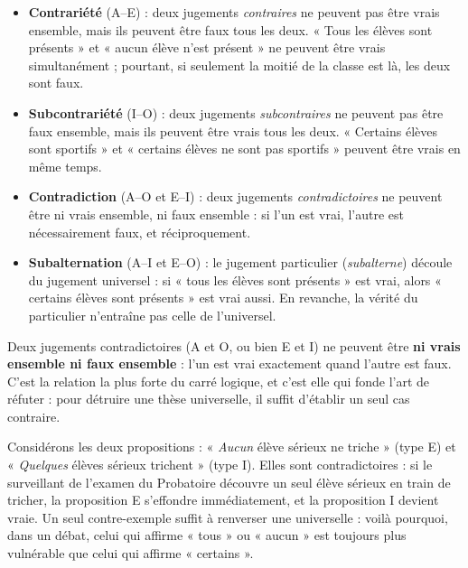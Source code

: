 \documentclass[11pt]{article}
\begin{document}
\begin{definition}
\begin{itemize}
\item \textbf{Contrariété} (A--E) : deux jugements \emph{contraires} ne peuvent pas être vrais ensemble, mais ils peuvent être faux tous les deux. « Tous les élèves sont présents » et « aucun élève n'est présent » ne peuvent être vrais simultanément ; pourtant, si seulement la moitié de la classe est là, les deux sont faux.
\item \textbf{Subcontrariété} (I--O) : deux jugements \emph{subcontraires} ne peuvent pas être faux ensemble, mais ils peuvent être vrais tous les deux. « Certains élèves sont sportifs » et « certains élèves ne sont pas sportifs » peuvent être vrais en même temps.
\item \textbf{Contradiction} (A--O et E--I) : deux jugements \emph{contradictoires} ne peuvent être ni vrais ensemble, ni faux ensemble : si l'un est vrai, l'autre est nécessairement faux, et réciproquement.
\item \textbf{Subalternation} (A--I et E--O) : le jugement particulier (\emph{subalterne}) découle du jugement universel : si « tous les élèves sont présents » est vrai, alors « certains élèves sont présents » est vrai aussi. En revanche, la vérité du particulier n'entraîne pas celle de l'universel.
\end{itemize}
\end{definition}

\begin{propriete}
Deux jugements contradictoires (A et O, ou bien E et I) ne peuvent être \textbf{ni vrais ensemble ni faux ensemble} : l'un est vrai exactement quand l'autre est faux. C'est la relation la plus forte du carré logique, et c'est elle qui fonde l'art de réfuter : pour détruire une thèse universelle, il suffit d'établir un seul cas contraire.
\end{propriete}

\begin{exemplebox}
Considérons les deux propositions : « \emph{Aucun} élève sérieux ne triche » (type E) et « \emph{Quelques} élèves sérieux trichent » (type I). Elles sont contradictoires : si le surveillant de l'examen du Probatoire découvre un seul élève sérieux en train de tricher, la proposition E s'effondre immédiatement, et la proposition I devient vraie. Un seul contre-exemple suffit à renverser une universelle : voilà pourquoi, dans un débat, celui qui affirme « tous » ou « aucun » est toujours plus vulnérable que celui qui affirme « certains ».
\end{exemplebox}
\end{document}
